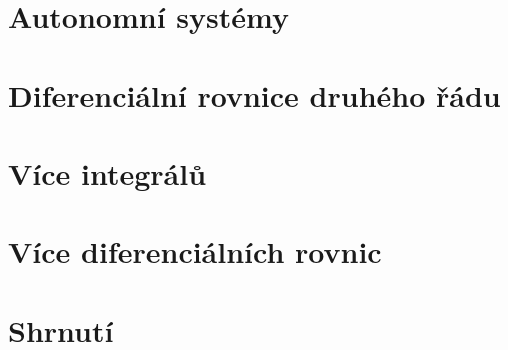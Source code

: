 \section{Autonomní systémy}

\section{Diferenciální rovnice druhého řádu}

\section{Více integrálů}

\section{Více diferenciálních rovnic}

\section{Shrnutí}






